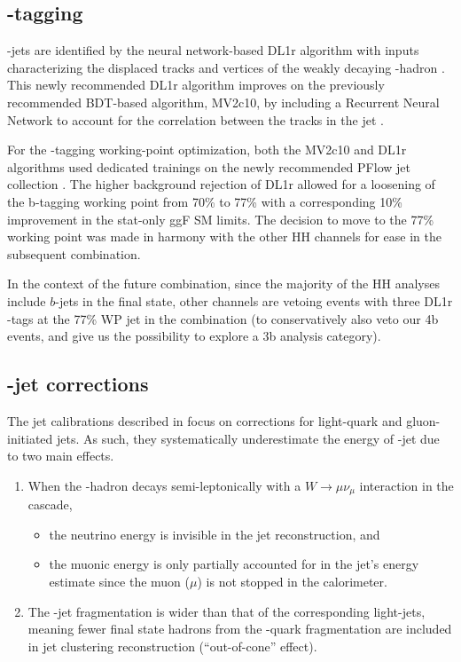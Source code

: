 \subsection{\Pqb-tagging}
\label{subsec:ftag-analysis}


\Pqb-jets are identified by the neural network-based DL1r algorithm with inputs characterizing the displaced tracks and vertices of the weakly decaying \Pqb-hadron \cite{FTAG-2018-01}. 
This newly recommended DL1r algorithm improves on the previously recommended BDT-based algorithm, MV2c10, by including a Recurrent Neural Network to account for the correlation between the tracks in the jet \cite{ATL-PHYS-PUB-2017-003}.

For the \Pqb-tagging working-point optimization, both the MV2c10 and DL1r algorithms used dedicated trainings on the newly recommended PFlow jet collection \cite{PFlowPublicPlots2019}.
The higher background rejection of DL1r allowed for a loosening of the b-tagging working point from 70\% to 77\% with a corresponding 10\% improvement in the stat-only ggF SM limits. 
The decision to move to the 77\% working point was made in harmony with the other HH channels for ease in the subsequent combination.

In the context of the future combination, since the majority of the HH analyses include $b$-jets in the final state, other channels are vetoing events with three DL1r \Pqb-tags at the 77\% WP jet in the combination (to conservatively also veto our 4b events, and give us the possibility to explore a 3b analysis category).

\subsection{\Pqb-jet corrections}
\label{subsec:regression}

The jet calibrations described in \Sect{\ref{subsec:jets-analysis}} focus on corrections for light-quark and gluon-initiated jets.
As such, they systematically underestimate the energy of \Pqb-jet due to two main effects.
\begin{enumerate}
	\item When the \Pqb-hadron decays semi-leptonically with a $W \rightarrow \mu \nu_\mu$ interaction in the cascade, %
	\begin{itemize}
		\item the neutrino energy is invisible in the jet reconstruction, and
		\item the muonic energy is only partially accounted for in the jet's energy estimate since the muon ($\mu$) is not stopped in the calorimeter.
	\end{itemize}
	\item The \Pqb-jet fragmentation is wider than that of the corresponding light-jets, meaning fewer final state hadrons from the \Pqb-quark fragmentation are included in jet clustering reconstruction (``out-of-cone'' effect).  
		
\end{enumerate}

